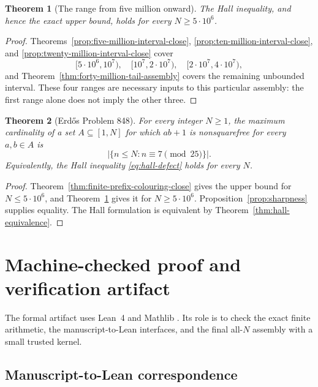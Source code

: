 \documentclass[11pt]{article}
\newtheorem{theorem}{Theorem}[section]
\theoremstyle{definition}
\newcommand{\FiveMillion}{5\cdot10^6}
\newcommand{\TenMillion}{10^7}
\newcommand{\TwentyMillion}{2\cdot10^7}
\newcommand{\FortyMillion}{4\cdot10^7}
\begin{document}
\begin{theorem}[The range from five million onward]
\label{thm:mixed-cell-five-million-close}
The Hall inequality, and hence the exact upper bound, holds for every
$N\geq\FiveMillion$.
\end{theorem}

\begin{proof}
Theorems~\ref{prop:five-million-interval-close},
\ref{prop:ten-million-interval-close}, and
\ref{prop:twenty-million-interval-close} cover
\[
 [\FiveMillion,\TenMillion),\quad
 [\TenMillion,\TwentyMillion),\quad
 [\TwentyMillion,\FortyMillion),
\]
and Theorem~\ref{thm:forty-million-tail-assembly} covers the remaining
unbounded interval.  These four ranges are necessary inputs to this
particular assembly: the first range alone does not imply the other three.
\end{proof}

\begin{theorem}[Erd\H{o}s Problem 848]
\label{thm:erdos-848-complete}
For every integer $N\geq1$, the maximum cardinality of a set
$A\subseteq[1,N]$ for which $ab+1$ is nonsquarefree for every $a,b\in A$ is
\[
 \left|\{n\leq N:n\equiv7\pmod {25}\}\right|.
\]
Equivalently, the Hall inequality \eqref{eq:hall-defect} holds for every $N$.
\end{theorem}

\begin{proof}
Theorem~\ref{thm:finite-prefix-colouring-close} gives the upper bound for
$N\leq\FiveMillion$, and
Theorem~\ref{thm:mixed-cell-five-million-close} gives it for
$N\geq\FiveMillion$.  Proposition~\ref{prop:sharpness} supplies equality.
The Hall formulation is equivalent by
Theorem~\ref{thm:hall-equivalence}.
\end{proof}

\section{Machine-checked proof and verification artifact}
\label{sec:machine-proof}

The formal artifact uses Lean~4 and Mathlib \cite{Lean4,Mathlib}.  Its role
is to check the exact finite arithmetic, the manuscript-to-Lean interfaces,
and the final all-$N$ assembly with a small trusted kernel.

\subsection*{Manuscript-to-Lean correspondence}
\end{document}
